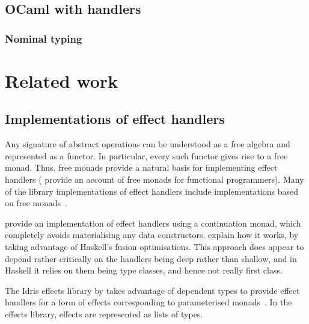\documentclass[mscres,cdtppar,twoside,openright,logo,rightchapter,normalheadings]{infthesis}
\theoremstyle{definition}
\begin{document}
\section{OCaml with handlers}
\label{sec:ocaml-handlers}

\subsection{Nominal typing}

\chapter{Related work}
\label{ch:related-work}

\section{Implementations of effect handlers}
Any signature of abstract operations can be understood as a free
algebra and represented as a functor. In particular, every such
functor gives rise to a free monad. Thus, free monads provide a
natural basis for implementing effect handlers (\citet{Swierstra2008b}
provide an account of free monads for functional programmers).  Many
of the library implementations of effect handlers include
implementations based on free monads~\citep{Kammar2013, Kiselyov2013,
  Kiselyov2015, Brady2013, Wu2014}.

\citet{Kammar2013} provide an implementation of effect handlers using
a continuation monad, which completely avoids materialising any data
constructors. \citet{Wu2015} explain how it works, by taking advantage
of Haskell's fusion optimisations. This approach does appear to depend
rather critically on the handlers being deep rather than shallow, and
in Haskell it relies on them being type classes, and hence not really
first class.

The Idris effects library by \cite{Brady2013} takes advantage of
dependent types to provide effect handlers for a form of effects
corresponding to parameterised monads~\citep{Atkey09}.
%
In the effects library, effects are represented as lists of types.
\end{document}
